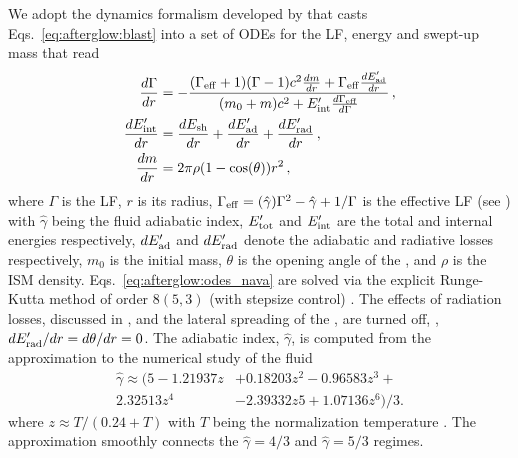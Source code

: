 We adopt the \blast{} dynamics formalism developed by \citet{Nava:2013} that casts 
Eqs.~\eqref{eq:afterglow:blast} into a set of \acp{ODE} for the \blast{} \ac{LF}, 
energy and swept-up mass that read 
%
\begin{subequations}
    \label{eq:afterglow:odes_nava}
    \begin{align}
    \frac{d\Gamma}{dr} &= -\frac{(\Gamma_{\rm eff} + 1)(\Gamma - 1) c^2\frac{dm}{dr} + \Gamma_{\rm eff}\frac{dE'_{\rm ad}}{dr}}{(m_0 + m) c^2 + E'_{\rm int}\frac{d\Gamma_{\rm eff}\rm }{d\Gamma}}\, , \\
    \frac{dE'_{\rm int}}{dr} &= \frac{dE_{\rm sh}}{dr} + \frac{dE'_{\rm ad}}{dr} + \frac{dE'_{\rm rad}}{dr}\, , \\
    \frac{dm}{dr} &= 2 \pi \rho (1 - \cos(\theta)) r^2\, ,
    \end{align}
\end{subequations}
%
where $\Gamma$ is the \blast{} \ac{LF}, $r$ is its radius, 
$\Gamma_{\rm eff} = (\hat{\gamma})\Gamma^2-\hat{\gamma}+1 / \Gamma$ is the effective 
\ac{LF} (see \citet{Nava:2013}) 
with $\hat{\gamma}$ being the fluid adiabatic index, 
$E'_{\rm tot}$ and  $E'_{\rm int}$ are the total and internal energies respectively, 
$dE'_{\rm ad}$ and $dE'_{\rm rad}$ denote the adiabatic and radiative losses respectively, 
$m_0$ is the initial mass, 
$\theta$ is the opening angle of the \blast{}, 
and $\rho$ is the \ac{ISM} density.
%
Eqs.~\ref{eq:afterglow:odes_nava} are solved via the 
explicit Runge-Kutta method of order $8(5,3)$ 
(with stepsize control) \citep{Dormand:1980}. 
%
The effects of radiation losses, discussed in \citet{Nava:2013}, and the lateral 
spreading of the \blast{} \citep[\eg][]{Granot:2012}, are turned off,
\ie, $d E'_{\rm rad}/dr = d\theta / dr = 0$.
%
The adiabatic index, $\hat{\gamma}$, is computed from the approximation to the 
numerical study of the \trans{} fluid \citep{Service:1986}
%
\begin{equation}
    \begin{aligned}
    \hat{\gamma} \approx (5 - 1.21937z &+ 0.18203z^2 - 0.96583z^3 + \\
    2.32513z^4 &- 2.39332z 5 + 1.07136z^6)/3.
    \end{aligned}
\end{equation}
% 
where $z \approx T/(0.24 + T)$ with $T$ being the normalization temperature
\citep{Peer:2012}.
%
The approximation smoothly connects the 
$\hat{\gamma}=4/3$ and $\hat{\gamma}=5/3$ regimes. 


